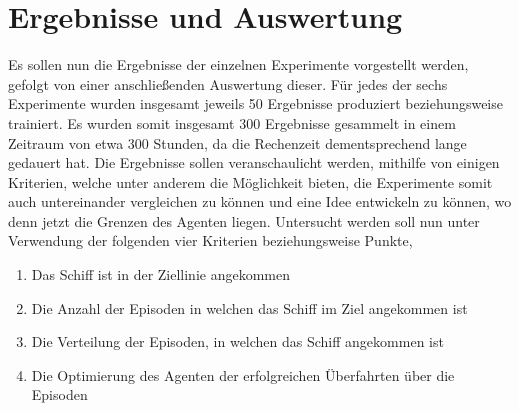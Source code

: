 \documentclass[]{iat}
\begin{document}
\section{Ergebnisse und Auswertung}
Es sollen nun die Ergebnisse der einzelnen Experimente vorgestellt werden, gefolgt von einer anschließenden Auswertung dieser. Für jedes der sechs Experimente wurden insgesamt jeweils 50 Ergebnisse produziert beziehungsweise trainiert. Es wurden somit insgesamt 300 Ergebnisse gesammelt in einem Zeitraum von etwa 300 Stunden, da die Rechenzeit dementsprechend lange gedauert hat. Die Ergebnisse sollen veranschaulicht werden, mithilfe von einigen Kriterien, welche unter anderem die Möglichkeit bieten, die Experimente somit auch untereinander vergleichen zu können und eine Idee entwickeln zu können, wo denn jetzt die Grenzen des Agenten liegen. Untersucht werden soll nun unter Verwendung der folgenden vier Kriterien beziehungsweise Punkte,
\begin{enumerate}
    \item Das Schiff ist in der Ziellinie angekommen
    \item Die Anzahl der Episoden in welchen das Schiff im Ziel angekommen ist
    \item Die Verteilung der Episoden, in welchen das Schiff angekommen ist
    \item Die Optimierung des Agenten der erfolgreichen Überfahrten über die Episoden
\end{enumerate}
\end{document}
